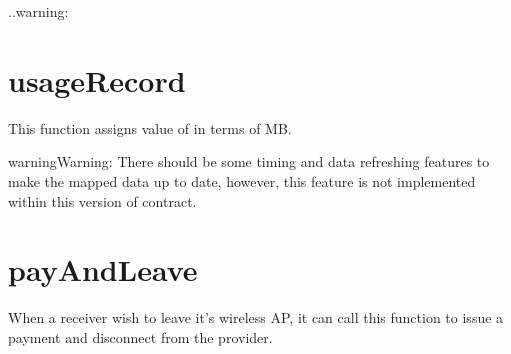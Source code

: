\documentclass[letterpaper,10pt,english]{sphinxmanual}
\begin{document}
..warning:

%
\begin{sphinxVerbatim}[commandchars=\\\{\}]
                       
\end{sphinxVerbatim}


\section{usageRecord}
\label{\detokenize{index:usagerecord}}
%
\begin{sphinxVerbatim}[commandchars=\\\{\}]
     
\end{sphinxVerbatim}

This function assigns value of {\hyperref[\detokenize{index:usageof}]{}} in terms of MB.

\begin{sphinxadmonition}{warning}{Warning:}
There should be some timing and data refreshing features to make the mapped data up to date, however, this feature is not implemented within this version of contract.
\end{sphinxadmonition}


\section{payAndLeave}
\label{\detokenize{index:payandleave}}
%
\begin{sphinxVerbatim}[commandchars=\\\{\}]
     
\end{sphinxVerbatim}

When a receiver wish to leave it’s wireless AP, it can call this function to issue a payment and disconnect from the provider.



\renewcommand{\indexname}{Index}
\printindex
\end{document}
